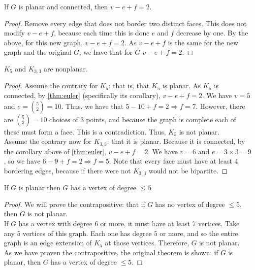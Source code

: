 \begin{corollary} If $G$ is planar and connected, then $v-e+f = 2$.
\end{corollary}
\begin{proof}
  Remove every edge that does not border two distinct faces. This does not modify $v - e + f$, because each time this is done $e$ and $f$ decrease by one.  By the above, for this new graph, $v - e + f = 2$. As $v - e + f$ is the same for the new graph and the original $G$, we have that for $G$ $v - e + f = 2$.
\end{proof}

\begin{corollary} $K_5$ and $K_{3,3}$ are nonplanar.
\end{corollary}
\begin{proof}
  Assume the contrary for $K_5$: that is, that $K_5$ is planar. As $K_5$ is connected, by \ref{thm:euler} (specifically its corollary), $v - e + f = 2$. We have $v = 5$ and $e = \binom{5}{2} = 10$. Thus, we have that $5 - 10 + f = 2 \Rightarrow f = 7$. However, there are $\binom{5}{3} = 10$ choices of $3$ points, and because the graph is complete each of these must form a face. This is a contradiction. Thus, $K_5$ is not planar. \\
  Assume the contrary now for $K_{3, 3}$: that it is planar. Because it is connected, by the corollary above of \ref{thm:euler}, $v - e + f = 2$. We have $v = 6$ and $e = 3 \times 3 = 9$, so we have $6 - 9 + f = 2 \Rightarrow f = 5$. Note that every face must have at least $4$ bordering edges, because if there were not $K_{3, 3}$ would not be bipartite. 
\end{proof}

\begin{theorem} If $G$ is planar then $G$ has a vertex of degree $\leq 5$
\end{theorem}
\begin{proof}
  We will prove the contrapositive: that if $G$ has no vertex of degree $\le 5$, then $G$ is not planar. \\
  If $G$ has a vertex with degree $6$ or more, it must have at least $7$ vertices. Take any $5$ vertices of this graph. Each one has degree $5$ or more, and so the entire graph is an edge extension of $K_5$ at those vertices. Therefore, $G$ is not planar. \\
  As we have proven the contrapositive, the original theorem is shown: if $G$ is planar, then $G$ has a vertex of degree $\le 5$.
\end{proof}

